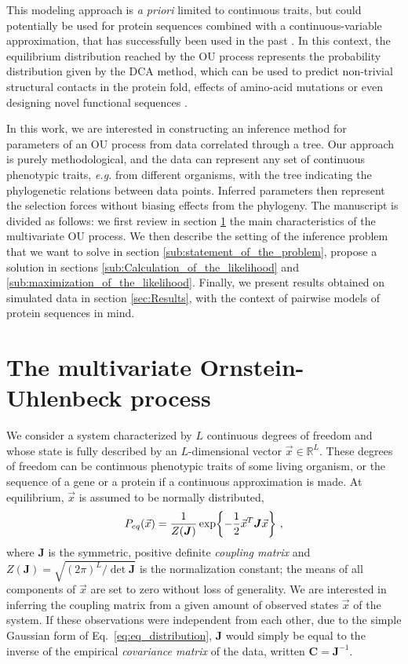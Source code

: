 \documentclass[preprint,amsmath,amssymb,superscriptaddress,showpacs,pre]{revtex4-1}
\let\originalleft\left
\let\originalright\right
\renewcommand{\left}{\mathopen{}\mathclose\bgroup\originalleft}
\renewcommand{\right}{\aftergroup\egroup\originalright}
\def\vx{\vec x}
\newcommand{\curlynormal}[1]{\exp\left\{-\frac{1}{2} #1 \right\}}
\begin{document}
This modeling approach is \emph{a priori} limited to continuous traits, but could potentially be used for protein sequences combined with a continuous-variable approximation, that has successfully been used in the past \cite{jones_psicov_2012,barton_large_2014,baldassi_fast_2014}. 
In this context, the equilibrium distribution reached by the OU process represents the probability distribution given by the DCA method, which can be used to predict non-trivial structural contacts in the protein fold, effects of amino-acid mutations or even designing novel functional sequences \cite{morcos_direct-coupling_2011, figliuzzi_coevolutionary_2016, russ_evolution-based_2020}. 


In this work, we are interested in constructing an inference method for parameters of an OU process from data correlated through a tree.
Our approach is purely methodological, and the data can represent any set of continuous phenotypic traits, \emph{e.g.} from different organisms, with the tree indicating the phylogenetic relations between data points. 
Inferred parameters then represent the selection forces without biasing effects from the phylogeny. 
The manuscript is divided as follows: we first review in section \ref{sec:ornstein_uhlenbeck_dynamics} the main characteristics of the multivariate OU process. 
We then describe the setting of the inference problem that we want to solve in section \ref{sub:statement_of_the_problem}, propose a solution in sections \ref{sub:Calculation_of_the_likelihood} and \ref{sub:maximization_of_the_likelihood}.
Finally, we present results obtained on simulated data in section \ref{sec:Results}, with the context of pairwise models of protein sequences in mind. 


\section{The multivariate Ornstein-Uhlenbeck process}
\label{sec:ornstein_uhlenbeck_dynamics}

We consider a system characterized by $L$ continuous degrees of freedom and whose state is fully described by an $L$-dimensional vector $\vx\in\mathbb{R}^L$. These degrees of freedom can be continuous phenotypic traits of some living organism, or the sequence of a gene or a protein if a continuous approximation is made. 
At equilibrium, $\vx$ is assumed to be normally distributed,
\begin{equation}
	P_{eq}(\vx) = \frac{1}{Z(\bm{J})}\curlynormal{\vx^T\bm{J}\vx}\ ,
	\label{eq:eq_distribution}
\end{equation}
where $\bm{J}$ is the symmetric, positive definite \emph{coupling matrix} and $Z(\bm{J}) = \sqrt{(2\pi)^L/\det \bm{J}}$ is the normalization constant; the means of all components of $\vx$ are set to zero without loss of generality. 
We are interested in inferring the coupling matrix from a given amount of observed states $\vx$ of the system.
If these observations were independent from each other, due to the simple Gaussian form of Eq.~\eqref{eq:eq_distribution}, $\bm{J}$ would simply be equal to the inverse of the empirical \emph{covariance matrix} of the data, written $\bm{C}=\bm{J}^{-1}$. 
\end{document}
